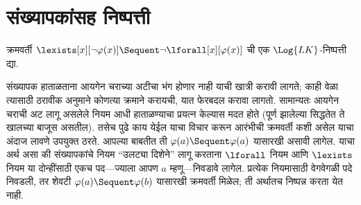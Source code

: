 \section{संख्यापकांसह निष्पत्ती}\label{fol:seq:prq:sec}

\begin{ex}
क्रमवर्ती $\lexists[x][\lnot \varphi(x)]
\Sequent \lnot \lforall[x][\varphi(x)]$ ची एक $\Log{LK}$-निष्पत्ती द्या.

संख्यापक हाताळताना आयगेन चराच्या अटीचा भंग होणार नाही याची खात्री करावी
लागते; काही वेळा त्यासाठी ठरावीक अनुमाने कोणत्या क्रमाने करायची, यात फेरबदल
करावा लागतो. सामान्यतः आयगेन चराची अट लागू असलेले नियम आधी हाताळण्याचा
प्रयत्न केल्यास मदत होते (पूर्ण झालेल्या सिद्धतेत ते खालच्या बाजूस असतील).
तसेच पुढे काय येईल याचा विचार करून आरंभीची क्रमवर्ती कशी असेल याचा अंदाज
लावणे उपयुक्त ठरते. आपल्या बाबतीत ती $\varphi(a) \Sequent \varphi(a)$ यासारखी असावी
लागेल. याचा अर्थ असा की संख्यापकांचे नियम ``उलट्या दिशेने'' लागू करताना
$\lforall$ नियम आणि $\lexists$ नियम या दोन्हींसाठी एकच पद---ज्याला आपण $a$
म्हणू---निवडावे लागेल. प्रत्येक नियमासाठी वेगवेगळी पदे निवडली, तर शेवटी
$\varphi(a) \Sequent \varphi(b)$ यासारखी क्रमवर्ती मिळेल; ती अर्थातच निष्पन्न करता
येत नाही.


\end{ex}
